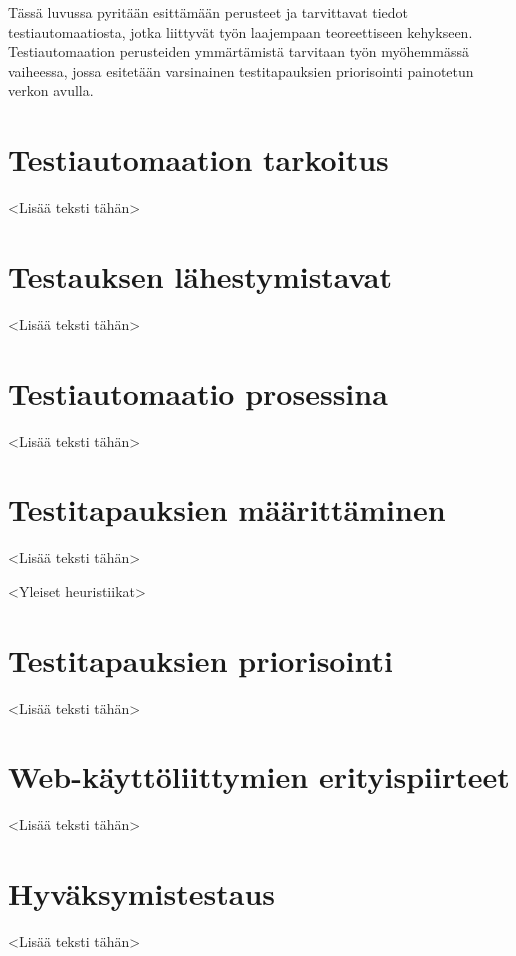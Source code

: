 Tässä luvussa pyritään esittämään perusteet ja tarvittavat tiedot testiautomaatiosta, jotka liittyvät työn laajempaan teoreettiseen kehykseen.
Testiautomaation perusteiden ymmärtämistä tarvitaan työn myöhemmässä vaiheessa, jossa esitetään varsinainen testitapauksien priorisointi painotetun verkon avulla.

\section{Testiautomaation tarkoitus}

<Lisää teksti tähän>

\section{Testauksen lähestymistavat}

<Lisää teksti tähän>

\section{Testiautomaatio prosessina}

<Lisää teksti tähän>

\section{Testitapauksien määrittäminen}

<Lisää teksti tähän>

<Yleiset heuristiikat>

\section{Testitapauksien priorisointi}

<Lisää teksti tähän>

\section{Web-käyttöliittymien erityispiirteet}

<Lisää teksti tähän>

\section{Hyväksymistestaus}

<Lisää teksti tähän>
